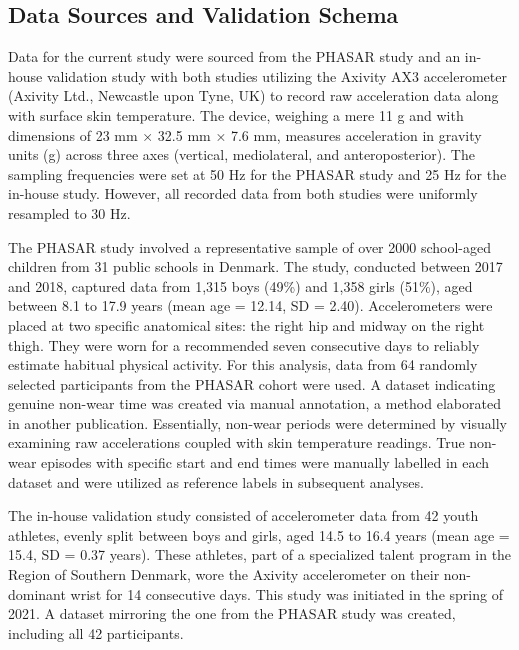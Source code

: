 \documentclass[
  10pt,
]{scrbook}
\begin{document}
\hypertarget{data-sources-and-validation-schema}{%
\subsection{Data Sources and Validation
Schema}\label{data-sources-and-validation-schema}}

Data for the current study were sourced from the PHASAR study and an
in-house validation study with both studies utilizing the Axivity AX3
accelerometer (Axivity Ltd., Newcastle upon Tyne, UK) to record raw
acceleration data along with surface skin temperature. The device,
weighing a mere 11 g and with dimensions of 23 mm × 32.5 mm × 7.6 mm,
measures acceleration in gravity units (g) across three axes (vertical,
mediolateral, and anteroposterior). The sampling frequencies were set at
50 Hz for the PHASAR study and 25 Hz for the in-house study. However,
all recorded data from both studies were uniformly resampled to 30 Hz.

The PHASAR study involved a representative sample of over 2000
school-aged children from 31 public schools in Denmark. The study,
conducted between 2017 and 2018, captured data from 1,315 boys (49\%)
and 1,358 girls (51\%), aged between 8.1 to 17.9 years (mean age =
12.14, SD = 2.40). Accelerometers were placed at two specific anatomical
sites: the right hip and midway on the right thigh. They were worn for a
recommended seven consecutive days to reliably estimate habitual
physical activity. For this analysis, data from 64 randomly selected
participants from the PHASAR cohort were used. A dataset indicating
genuine non-wear time was created via manual annotation, a method
elaborated in another publication. Essentially, non-wear periods were
determined by visually examining raw accelerations coupled with skin
temperature readings. True non-wear episodes with specific start and end
times were manually labelled in each dataset and were utilized as
reference labels in subsequent analyses.

The in-house validation study consisted of accelerometer data from 42
youth athletes, evenly split between boys and girls, aged 14.5 to 16.4
years (mean age = 15.4, SD = 0.37 years). These athletes, part of a
specialized talent program in the Region of Southern Denmark, wore the
Axivity accelerometer on their non-dominant wrist for 14 consecutive
days. This study was initiated in the spring of 2021. A dataset
mirroring the one from the PHASAR study was created, including all 42
participants.
\end{document}
